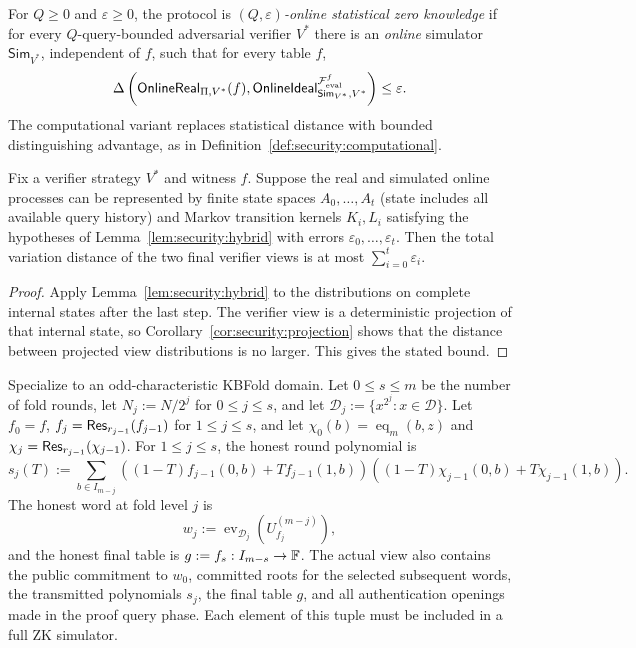 \begin{definition}\label{def:security:online-zk}
For $Q\geq0$ and $\varepsilon\geq0$, the protocol is \emph{$(Q,\varepsilon)$-online statistical zero knowledge} if for every $Q$-query-bounded adversarial verifier $V^*$ there is an \emph{online} simulator $\mathsf{Sim}_{V^*}$, independent of $f$, such that for every table $f$,
\[
 \Delta\left(
  \mathsf{OnlineReal}_{\Pi,V^*}(f),
  \mathsf{OnlineIdeal}_{\mathsf{Sim}_{V^*},V^*}^{\mathcal F_{\rm eval}^f}
 \right)\leq\varepsilon.
\]
The computational variant replaces statistical distance with bounded distinguishing advantage, as in Definition~\ref{def:security:computational}.
\end{definition}

\begin{lemma}\label{lem:security:online-hybrid}
Fix a verifier strategy $V^*$ and witness $f$. Suppose the real and simulated online processes can be represented by finite state spaces $A_0,\ldots,A_t$ (state includes all available query history) and Markov transition kernels $K_i,L_i$ satisfying the hypotheses of Lemma~\ref{lem:security:hybrid} with errors $\varepsilon_0,\ldots,\varepsilon_t$. Then the total variation distance of the two final verifier views is at most $\sum_{i=0}^t\varepsilon_i$.
\end{lemma}
\begin{proof}
Apply Lemma~\ref{lem:security:hybrid} to the distributions on complete internal states after the last step. The verifier view is a deterministic projection of that internal state, so Corollary~\ref{cor:security:projection} shows that the distance between projected view distributions is no larger. This gives the stated bound.
\end{proof}

\begin{definition}\label{def:security:kbfold-transcript}
Specialize to an odd-characteristic KBFold domain. Let $0\leq s\leq m$ be the number of fold rounds, let $N_j:=N/2^j$ for $0\leq j\leq s$, and let $\mathcal D_j:=\{x^{2^j}:x\in\mathcal D\}$. Let $f_0=f$, $f_j=\mathsf{Res}_{r_{j-1}}(f_{j-1})$ for $1\leq j\leq s$, and let $\chi_0(b)=\operatorname{eq}_m(b,z)$ and $\chi_j=\mathsf{Res}_{r_{j-1}}(\chi_{j-1})$.
For $1\leq j\leq s$, the honest round polynomial is
\begin{equation}\label{eq:security:kbfold-round}
 s_j(T):=\sum_{b\in I_{m-j}}
 \left((1-T)f_{j-1}(0,b)+Tf_{j-1}(1,b)\right)
 \left((1-T)\chi_{j-1}(0,b)+T\chi_{j-1}(1,b)\right).
\end{equation}
The honest word at fold level $j$ is
\[
 w_j:=\operatorname{ev}_{\mathcal D_j}(U_{f_j}^{(m-j)}),
\]
and the honest final table is $g:=f_s:I_{m-s}\to\mathbb{F}$. The actual view also contains the public commitment to $w_0$, committed roots for the selected subsequent words, the transmitted polynomials $s_j$, the final table $g$, and all authentication openings made in the proof query phase. Each element of this tuple must be included in a full ZK simulator.
\end{definition}

